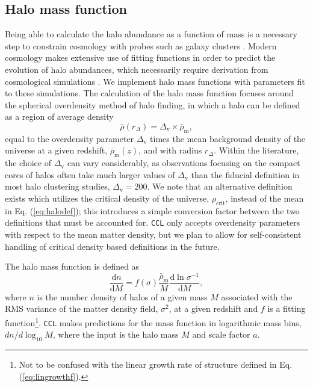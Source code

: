 \documentclass[\docopts]{\docclass}
\newcommand{\ccl}{{\tt CCL}\xspace}
\begin{document}
\subsection{Halo mass function}
\label{sec:hmfdef}

Being able to calculate the halo abundance as a function of mass is a necessary step to constrain cosmology with probes such as galaxy clusters \cite{Paranjape2014}. Modern cosmology makes extensive use of fitting functions in order to predict the evolution of halo abundances, which necessarily require derivation from cosmological simulations \citep{Tinker2008, Tinker2010, Angulo2012}. We implement halo mass functions with parameters fit to these simulations. The calculation of the halo mass function focuses around the spherical overdensity method of halo finding, in which a halo can be defined as a region of average density
\begin{equation}
  \bar{\rho}(r_{\Delta}) = \Delta_\mathrm{v} \times \bar{\rho}_{\mathrm{m}},
  \label{eq:halodef}
\end{equation}
%
equal to the overdensity parameter $\Delta_\mathrm{v}$ times the mean background density of the universe at a given redshift, $\bar\rho_{\mathrm{m}}(z)$, and with radius $r_{\Delta}$. Within the literature, the choice of $\Delta_\mathrm{v}$ can vary considerably, as observations focusing on the compact cores of halos often take much larger values of $\Delta_\mathrm{v}$ than the fiducial definition in most halo clustering studies, $\Delta_\mathrm{v} = 200$. We note that an alternative definition exists which utilizes the critical density of the universe, $\rho_{\mathrm{crit}}$, instead of the mean in Eq. (\ref{eq:halodef}); this introduces a simple conversion factor between the two definitions that must be accounted for. \ccl only accepts overdensity parameters with respect to the mean matter density, but we plan to allow for self-consistent handling of critical density based definitions in the future. 

The halo mass function is defined as
\begin{equation}
\frac{\mathrm{d}n}{\mathrm{d}M}=f(\sigma)\frac{\bar{\rho}_\mathrm{m}}{M}\frac{\mathrm{d}\ln{\sigma^{-1}}}{\mathrm{d}M},
\label{eq:halo_mass_function}
\end{equation}
where $n$ is the number density of halos of a given mass $M$ associated with the RMS variance of the matter density field, $\sigma^2$, at a given redshift and $f$ is a fitting function\footnote{Not to be confused with the linear growth rate of structure defined in Eq. (\ref{eq:lingrowthf}).}. \ccl makes predictions for the mass function in logarithmic mass bins, $dn/d\log_{10}{M}$, where the input is the halo mass $M$ and scale factor $a$.
\end{document}
